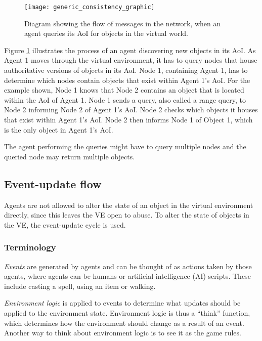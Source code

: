\begin{figure}[htbp]
 \centering
 \texttt{[image: generic\_consistency\_graphic]}
 \caption{Diagram showing the flow of messages in the network, when an agent queries its AoI for objects in the virtual world.}
 \label{fig_query_flow_graphic}
\end{figure}
%
Figure \ref{fig_query_flow_graphic} illustrates the process of an agent discovering new objects in its AoI. As Agent 1 moves through the virtual environment, it has to query nodes that house authoritative versions of objects in its AoI. Node 1, containing Agent 1, has to determine which nodes contain objects that exist within Agent 1's AoI. For the example shown, Node 1 knows that Node 2 contains an object that is located within the AoI of Agent 1. Node 1 sends a query, also called a range query, to Node 2 informing Node 2 of Agent 1's AoI. Node 2 checks which objects it houses that exist within Agent 1's AoI. Node 2 then informs Node 1 of Object 1, which is the only object in Agent 1's AoI.

The agent performing the queries might have to query multiple nodes and the queried node may return multiple objects.

\subsection{Event-update flow}
\label{event_logic_update}

Agents are not allowed to alter the state of an object in the virtual environment directly, since this leaves the VE open to abuse. To alter the state of objects in the VE, the event-update cycle is used.

\subsubsection{Terminology}
\emph{Events} are generated by agents and can be thought of as actions taken by those agents, where agents can be humans or artificial intelligence (AI) scripts. These include casting a spell, using an item or walking.

\emph{Environment logic} is applied to events to determine what updates should be applied to the environment state. Environment logic is thus a ``think'' function, which determines how the environment should change as a result of an event. Another way to think about environment logic is to see it as the game rules.

